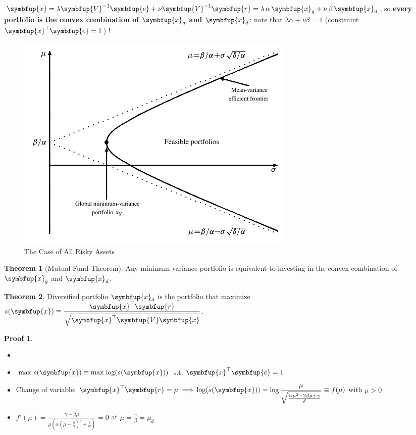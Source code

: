 \documentclass[11pt]{extarticle}
\newcommand{\ds}{\displaystyle}
\newcommand{\ie}{\;\Longrightarrow\;}
\newcommand{\vx}{\symbfup{x}}
\newcommand{\vV}{\symbfup{V}}
\newcommand{\ve}{\symbfup{e}}
\newcommand{\vr}{\symbfup{r}}
\theoremstyle{definition}
\newtheorem*{thm}{Theorem}
\newtheorem*{prf}{Proof}
\begin{document}
\noindent$\ds\vx = \lambda\vV^{-1}\ve + \nu\vV^{-1}\vr = \lambda\,\alpha\,\vx_g + \nu\,\beta\,\vx_d$, so {\bf every portfolio is the convex combination of $\vx_g$ and $\vx_d$}: note that $\ds\lambda\alpha + \nu\beta = 1$ (constraint $\ds\vx^\top\ve = 1$) ! 

\newpage

\begin{figure}[!htbp]
  \centering
  \includegraphics[scale=1.1,page=1]{fig/sfm.pdf}
  \caption{The Case of All Risky Assets}
  \label{fig:mv1}
\end{figure}

\newpage

\begin{thm}[Mutual Fund Theorem]
  Any minimum-variance portfolio is equivalent to investing in the convex combination of $\vx_g$ and $\vx_d$.
\end{thm}

\begin{thm}
  Diversified portfolio $\vx_d$ is the portfolio that maximize $\ds s(\vx)\equiv\frac{\vx^\top\vr}{\sqrt{\vx^\top\vV\vx}}$.
\end{thm}

\begin{prf}
  \begin{itemize}
    \item[]
    \item $\ds\max\,s(\vx)\equiv\max\,\log(s(\vx))$ s.t. $\ds\vx^\top\ve = 1$ 
    \item Change of variable: $\ds\vx^\top\vr = \mu \ie \\ \log(s(\vx)) = \log\frac{\mu}{\sqrt{\frac{\alpha\mu^2 - 2\beta\mu + \gamma}{\delta}}} \equiv f(\mu)$ with $\mu > 0$
    \item $\ds f'(\mu) = \frac{\gamma - \beta\mu}{\mu\left(\alpha\left(\mu - \frac{\beta}{\alpha}\right)^2 + \frac{\delta}{\alpha}\right)} = 0$ at $\ds\mu = \frac{\gamma}{\beta} = \mu_d$
  \end{itemize}
\end{prf}
\end{document}

